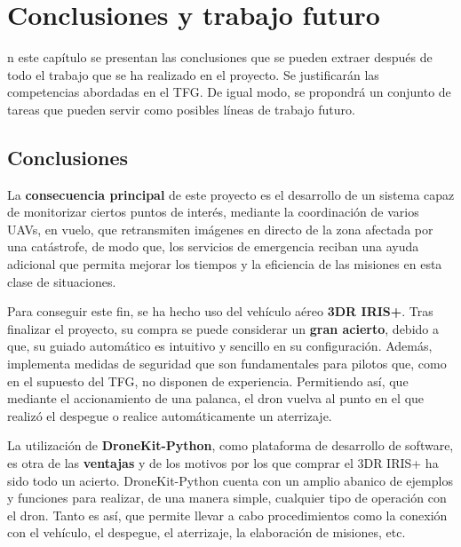 \chapter{Conclusiones y trabajo futuro}
\label{chap:conclusiones}

n este capítulo se presentan las conclusiones que se pueden extraer después de todo el trabajo que se ha realizado en el proyecto. Se justificarán las competencias abordadas en el \acs{TFG}. De igual modo, se propondrá un conjunto de tareas que pueden servir como posibles líneas de trabajo futuro.

\section{Conclusiones}
\label{sec:conclusiones}

La \textbf{consecuencia principal} de este proyecto es el desarrollo de un sistema capaz de monitorizar ciertos puntos de interés, mediante la coordinación de varios \acs{UAV}s, en vuelo, que retransmiten imágenes en directo de la zona afectada por una catástrofe, de modo que, los servicios de emergencia reciban una ayuda adicional que permita mejorar los tiempos y la eficiencia de las misiones en esta clase de situaciones. 

Para conseguir este fin, se ha hecho uso del vehículo aéreo \textbf{3DR IRIS+}. Tras finalizar el proyecto, su compra se puede considerar un \textbf{gran acierto}, debido a que, su guiado automático es intuitivo y sencillo en su configuración. Además, implementa medidas de seguridad que son fundamentales para pilotos que, como en el supuesto del \acs{TFG}, no disponen de experiencia. Permitiendo así, que mediante el accionamiento de una palanca, el dron vuelva al punto en el que realizó el despegue o realice automáticamente un aterrizaje. 

La utilización de \textbf{DroneKit-Python}, como plataforma de desarrollo de software, es otra de las \textbf{ventajas} y de los motivos por los que comprar el 3DR IRIS+ ha sido todo un acierto. DroneKit-Python cuenta con un amplio abanico de ejemplos y funciones para realizar, de una manera simple, cualquier tipo de operación con el dron. Tanto es así, que permite llevar a cabo procedimientos como la conexión con el vehículo, el despegue, el aterrizaje, la elaboración de misiones, etc.

